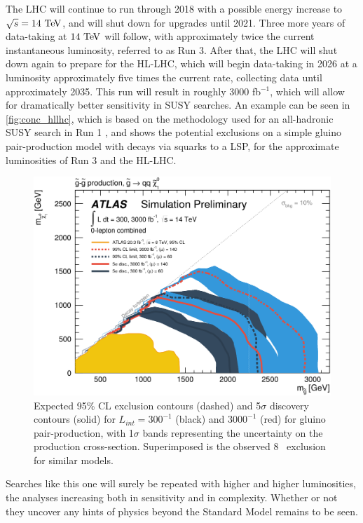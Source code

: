 The \ac{LHC} will continue to run through 2018 with a possible energy increase to $\sqrt{s} = 14\tev$, and will shut down for upgrades until 2021. Three more years of data-taking at $14\tev$ will follow, with approximately twice the current instantaneous luminosity, referred to as Run 3. After that, the \ac{LHC} will shut down again to prepare for the \ac{HL-LHC}, which will begin data-taking in 2026 at a luminosity approximately five times the current rate, collecting data until approximately 2035. This run will result in roughly 3000 fb$^{-1}$, which will allow for dramatically better sensitivity in \ac{SUSY} searches. An example can be seen in \autoref{fig:conc_hllhc}, which is based on the methodology used for an all-hadronic \ac{SUSY} search in Run 1 \cite{Aad:2014wea}, and shows the potential exclusions on a simple gluino pair-production model with decays via squarks to a \ac{LSP}, for the approximate luminosities of Run 3 and the \ac{HL-LHC}. 

\begin{figure}[!htb]
\centering
\includegraphics[width=.9\textwidth]{figures/interpretation/fig_09a.png}
\caption{ Expected 95\% \ac{CL} exclusion contours (dashed) and 5$\sigma$ discovery contours (solid) for $L_{int} = 300^{-1}$ (black) and $3000^{-1}$ (red) for gluino pair-production, with 1$\sigma$ bands representing the uncertainty on the production cross-section. Superimposed is the observed 8 \tev~exclusion for similar models. \cite{ATL-PHYS-PUB-2014-010}}
\label{fig:conc_hllhc}
\end{figure}

Searches like this one will surely be repeated with higher and higher luminosities, the analyses increasing both in sensitivity and in complexity. Whether or not they uncover any hints of physics beyond the Standard Model remains to be seen. 



